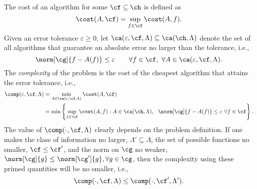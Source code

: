 \documentclass[12pt]{amsart}
\begin{document}
The cost of an algorithm for some $\cf \subseteq \ch$ is defined as
\begin{equation}\label{algcost}
\cost(A,\cf) = \sup_{f \in \cf} \cost(A,f).
\end{equation}
Given an error tolerance $\varepsilon \ge 0$, let $\ca(\varepsilon,\cf,\Lambda) \subseteq \ca(\ch,\Lambda)$ denote the set of all algorithms that guarantee an absolute error no larger than the tolerance, i.e.,  
\begin{equation} \label{abserrcrit}
\norm[\cg]{f - A(f)} \le \varepsilon \qquad \forall f \in \cf,\ \forall A \in \ca(\varepsilon,\cf,\Lambda).
\end{equation}
The \emph{complexity} of the problem is the cost of the cheapest algorithm that attains the error tolerance, i.e., 
\begin{align} \label{compdef}
\comp(\varepsilon,\cf,\Lambda) &= \min_{A \in \ca(\varepsilon,\cf,\Lambda)} \cost(A,\cf)\\
\nonumber
&= \min \left\{\sup_{f \in \cf} \cost(A,f) : A \in \ca(\ch,\Lambda), \ \ \norm[\cg]{f - A(f)} \le \varepsilon \ \forall f \in \cf \right\}.
\end{align}
The value of $\comp(\cdot,\cf,\Lambda)$ clearly depends on the problem definition.  If one makes the class of information no larger, $\Lambda' \subseteq \Lambda$, the set of possible functions no smaller, $\cf \le \cf'$, and the norm on $\cg$ no weaker, $\norm[\cg]{g} \le \norm[\cg']{g},  \forall g \in \cg$, then the complexity using these primed quantities will be no smaller, i.e., 
\[
\comp(\cdot,\cf,\Lambda) \le \comp(\cdot,\cf',\Lambda').
\]
\end{document}
